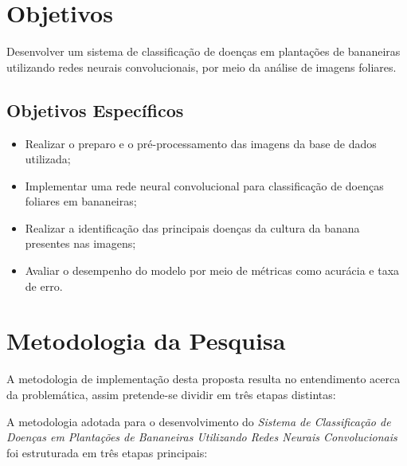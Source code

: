 \section{Objetivos}


Desenvolver um sistema de classificação de doenças em plantações de bananeiras utilizando redes neurais convolucionais, por meio da análise de imagens foliares.


\subsection{Objetivos Específicos}
    \begin{itemize}
      \item Realizar o preparo e o pré-processamento das imagens da base de dados utilizada;
      \item Implementar uma rede neural convolucional para classificação de doenças foliares em bananeiras;
      \item Realizar a identificação das principais doenças da cultura da banana presentes nas imagens;
      \item Avaliar o desempenho do modelo por meio de métricas como acurácia e taxa de erro.
    \end{itemize}

\section{Metodologia da Pesquisa}

A metodologia de implementação desta proposta resulta no entendimento acerca da problemática, assim pretende-se dividir em três etapas distintas: 



A metodologia adotada para o desenvolvimento do \textit{Sistema de Classificação de Doenças em Plantações de Bananeiras Utilizando Redes Neurais Convolucionais} foi estruturada em três etapas principais:

